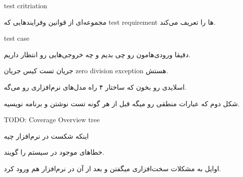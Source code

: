 \documentclass[a4paper]{article}
\begin{document}
test critriation

مجموعه‌ای از قوانین وفرایند‌هایی که test requirement ها را تعریف می‌کند.

test case

دقیقا ورودی‌هامون رو چی بدیم و چه خروجی‌هایی رو انتظار داریم.

جریان تست کیس جریان zero division exception هستش.

اسلایدی رو بخون که ساختار ۴ راه مدل‌های نرم‌افزاری رو می‌گه.

شکل دوم که عبارات منطقی رو میگه قبل از هر گونه تست نوشتن و برنامه نویسیه.

TODO: Coverage Overview tree

اینکه شکست در نرم‌افزار چیه


خطا‌های موجود در سیستم را گویند.



اوایل به مشکلات سخت‌افزاری میگفتن و بعد از آن در نرم‌افزار هم ورود کرد.



\newpage
\listoffigures
\listoftables

\end{document}
